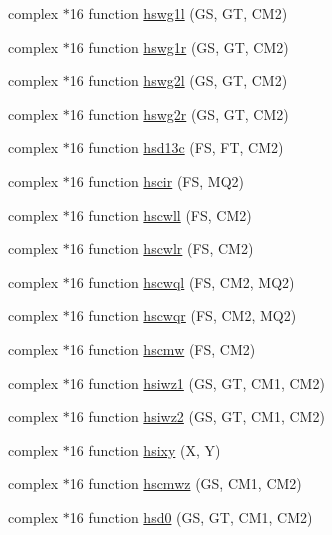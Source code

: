\begin{DoxyCompactItemize}
\item 
complex $\ast$16 function \hyperlink{djangoh__h_8f_abb2458bce9a3b0d42c668e047d2f22ed}{hswg1l} (G\+S, G\+T, C\+M2)
\item 
complex $\ast$16 function \hyperlink{djangoh__h_8f_a140724e9bd330e35b9c31b8de6001edb}{hswg1r} (G\+S, G\+T, C\+M2)
\item 
complex $\ast$16 function \hyperlink{djangoh__h_8f_aed3bff6b346cd0f10035f970652aa814}{hswg2l} (G\+S, G\+T, C\+M2)
\item 
complex $\ast$16 function \hyperlink{djangoh__h_8f_af087ee5df2d895e3826c980f55875348}{hswg2r} (G\+S, G\+T, C\+M2)
\item 
complex $\ast$16 function \hyperlink{djangoh__h_8f_aa0bae3f3986d41ccddbbe729945c2b3d}{hsd13c} (F\+S, F\+T, C\+M2)
\item 
complex $\ast$16 function \hyperlink{djangoh__h_8f_ae2c9b96a23af92b724c02469ce20e760}{hscir} (F\+S, M\+Q2)
\item 
complex $\ast$16 function \hyperlink{djangoh__h_8f_a394d43e9f2d86e852f18e5c0763e65ea}{hscwll} (F\+S, C\+M2)
\item 
complex $\ast$16 function \hyperlink{djangoh__h_8f_aa1ed15a3dc1205d55ee3a8eeb774b5d5}{hscwlr} (F\+S, C\+M2)
\item 
complex $\ast$16 function \hyperlink{djangoh__h_8f_a5bbc131d71e97e7f06c2e867bec24eec}{hscwql} (F\+S, C\+M2, M\+Q2)
\item 
complex $\ast$16 function \hyperlink{djangoh__h_8f_a67a8dbf09bfd8e694c25a01bc0341653}{hscwqr} (F\+S, C\+M2, M\+Q2)
\item 
complex $\ast$16 function \hyperlink{djangoh__h_8f_acfe5dd7a43646e43089a6cd30cb273ce}{hscmw} (F\+S, C\+M2)
\item 
complex $\ast$16 function \hyperlink{djangoh__h_8f_a57c2acc216ca2579ebdaffd3f7250e69}{hsiwz1} (G\+S, G\+T, C\+M1, C\+M2)
\item 
complex $\ast$16 function \hyperlink{djangoh__h_8f_ae089808ec513a8d216f6d1be102aa46a}{hsiwz2} (G\+S, G\+T, C\+M1, C\+M2)
\item 
complex $\ast$16 function \hyperlink{djangoh__h_8f_a785f3d406148e0a234e6f6514b985e81}{hsixy} (X, Y)
\item 
complex $\ast$16 function \hyperlink{djangoh__h_8f_ade989e0ec937cb227223cfbdf763a19d}{hscmwz} (G\+S, C\+M1, C\+M2)
\item 
complex $\ast$16 function \hyperlink{djangoh__h_8f_a41bd52092a8cc07e147442227603457f}{hsd0} (G\+S, G\+T, C\+M1, C\+M2)
\item 

\end{DoxyCompactItemize}
